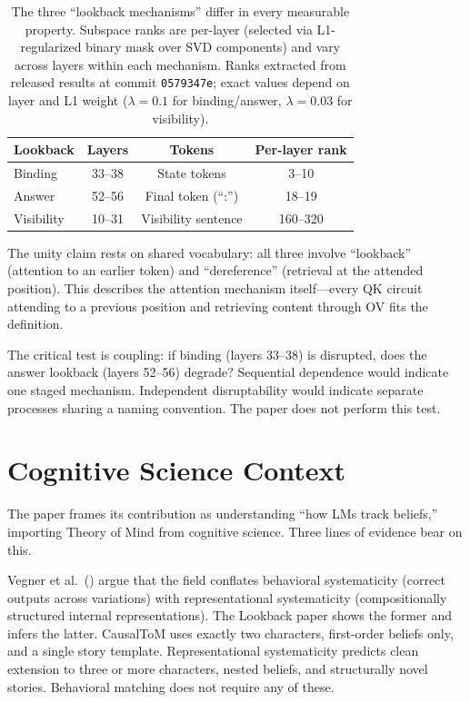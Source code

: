 \documentclass{article}
\begin{document}
\begin{table}[t]
\centering
\caption{The three ``lookback mechanisms'' differ in every measurable property. Subspace ranks are per-layer (selected via L1-regularized binary mask over SVD components) and vary across layers within each mechanism. Ranks extracted from released results at commit \texttt{0579347e}; exact values depend on layer and L1 weight ($\lambda = 0.1$ for binding/answer, $\lambda = 0.03$ for visibility).}
\label{tab:unity}
\begin{tabular}{lccc}
\toprule
Lookback & Layers & Tokens & Per-layer rank \\
\midrule
Binding & 33--38 & State tokens & 3--10 \\
Answer & 52--56 & Final token (``:'') & 18--19 \\
Visibility & 10--31 & Visibility sentence & 160--320 \\
\bottomrule
\end{tabular}
\end{table}

The unity claim rests on shared vocabulary: all three involve ``lookback'' (attention to an earlier token) and ``dereference'' (retrieval at the attended position). This describes the attention mechanism itself---every QK circuit attending to a previous position and retrieving content through OV fits the definition.

The critical test is coupling: if binding (layers 33--38) is disrupted, does the answer lookback (layers 52--56) degrade? Sequential dependence would indicate one staged mechanism. Independent disruptability would indicate separate processes sharing a naming convention. The paper does not perform this test.


\section{Cognitive Science Context}
\label{sec:cogsci}

The paper frames its contribution as understanding ``how LMs track beliefs,'' importing Theory of Mind from cognitive science. Three lines of evidence bear on this.

Vegner et al.\ (\citeyear{vegner2025systematicity}) argue that the field conflates behavioral systematicity (correct outputs across variations) with representational systematicity (compositionally structured internal representations). The Lookback paper shows the former and infers the latter. CausalToM uses exactly two characters, first-order beliefs only, and a single story template. Representational systematicity predicts clean extension to three or more characters, nested beliefs, and structurally novel stories. Behavioral matching does not require any of these.
\end{document}
